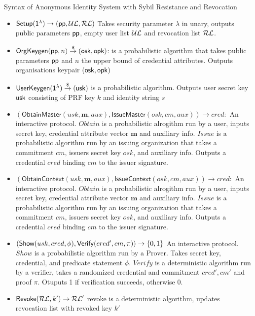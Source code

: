 Syntax of Anonymous Identity System with Sybil Resistance and Revocation
\begin{itemize}
    \item $\mathsf{Setup}(\mathsf{1^{\lambda}}) \to (\mathsf{pp}, \mathcal{UL}, \mathcal{RL})$ Takes security parameter $\lambda$ in unary, outputs public parameters $\mathsf{pp}$, empty user list $\mathcal{UL}$ and revocation list $\mathcal{RL}$.

    \item $\mathsf{OrgKeygen}(\mathsf{pp}, n) \stackrel{\$}{\to} (\mathsf{osk}, \mathsf{opk})$: is a probabilistic algorithm that takes public parameters $\mathsf{pp}$ and $n$ the upper bound of credential attributes. Outputs organisations keypair $(\mathsf{osk}, \mathsf{opk})$

    \item $\mathsf{UserKeygen}(\mathsf{1^{\lambda}}) \stackrel{\$}{\to} (\mathsf{usk})$ is a probabilistic algorithm. Outputs user secret key $\mathsf{usk}$ consisting of PRF key $k$ and identity string $s$

    \item $(\mathsf{Obtain Master}(usk, \textbf{m}, aux), \mathsf{Issue Master}(osk, cm, aux)) \to cred:$ An interactive protocol. $Obtain$ is a probabilistic alrogithm run by a user, inputs secret key, credential attribute vector $\textbf{m}$ and auxiliary info. $Issue$ is a probabilistic algorithm run by an issuing organization that takes a commitment $cm$, issuers secret key $osk$, and auxiliary info. Outputs a credential $cred$ binding $cm$ to the issuer signature.

    \item $(\mathsf{Obtain Context}(usk, \textbf{m}, aux), \mathsf{Issue Context}(osk, cm, aux)) \to cred:$ An interactive protocol. $Obtain$ is a probabilistic alrogithm run by a user, inputs secret key, credential attribute vector $\textbf{m}$ and auxiliary info. $Issue$ is a probabilistic algorithm run by an issuing organization that takes a commitment $cm$, issuers secret key $osk$, and auxiliary info. Outputs a credential $cred$ binding $cm$ to the issuer signature.

    \item $(\mathsf{Show}(usk, cred, \phi), \mathsf{Verify}(cred', cm, \pi)) \to \{0,1\}$ An interactive protocol. $Show$ is a probabilistic algorithm run by a Prover. Takes secret key, credential, and predicate statement $\phi$. $Verify$ is a deterministic algorithm run by a verifier, takes a randomized credential and commitment $cred', cm'$ and proof $\pi$. Otuputs 1 if verification succeeds, otherwise 0.

    \item $\mathsf{Revoke}(\mathcal{RL}, k') \to \mathcal{RL}'$ revoke is a deterministic algorithm, updates revocation list with revoked key $k'$
\end{itemize}

